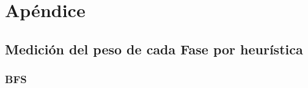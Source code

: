 \chapter{Apéndice}
\section{Medición del peso de cada Fase por heurística}



\FloatBarrier
\subsection{BFS}

